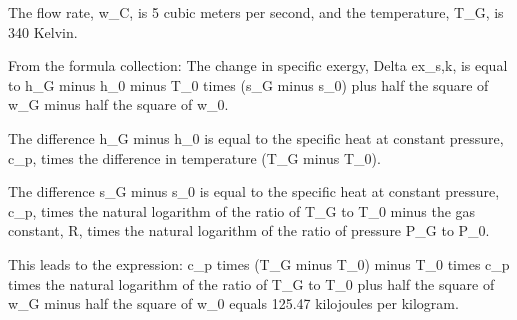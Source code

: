 The flow rate, w_C, is 5 cubic meters per second, and the temperature, T_G, is 340 Kelvin.

From the formula collection:
The change in specific exergy, Delta ex_{s,k}, is equal to h_G minus h_0 minus T_0 times (s_G minus s_0) plus half the square of w_G minus half the square of w_0.

The difference h_G minus h_0 is equal to the specific heat at constant pressure, c_p, times the difference in temperature (T_G minus T_0).

The difference s_G minus s_0 is equal to the specific heat at constant pressure, c_p, times the natural logarithm of the ratio of T_G to T_0 minus the gas constant, R, times the natural logarithm of the ratio of pressure P_G to P_0.

This leads to the expression:
c_p times (T_G minus T_0) minus T_0 times c_p times the natural logarithm of the ratio of T_G to T_0 plus half the square of w_G minus half the square of w_0 equals 125.47 kilojoules per kilogram.